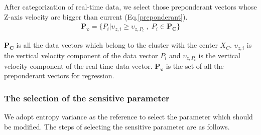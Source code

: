 After categorization of real-time data, we select those preponderant vectors whose Z-axis velocity are bigger than current (Eq.\ref{preponderant}).
\begin{eqnarray}\label{preponderant}
\bm{P_{\upsilon}}=\{P_{i} | \upsilon_{z,i}\geq \upsilon_{z,P_{t}} \; , \; P_{i}\in \bm{P_{C}}\}
\end{eqnarray}

$\bm{P_{C}}$ is all the data vectors which belong to the cluster with the  center $X_{C}$. $\upsilon_{z,i}$ is the vertical velocity component of the data vector $P_{i}$ and $\upsilon_{z,P_{t}}$ is the vertical velocity component of the real-time data vector. $\bm{P_{\upsilon}}$ is the set of all the preponderant vectors for regression.

\subsubsection{The selection of the sensitive parameter}

We adopt entropy variance as the reference to select the parameter which should be modified. The steps of selecting the sensitive parameter are as follows.

